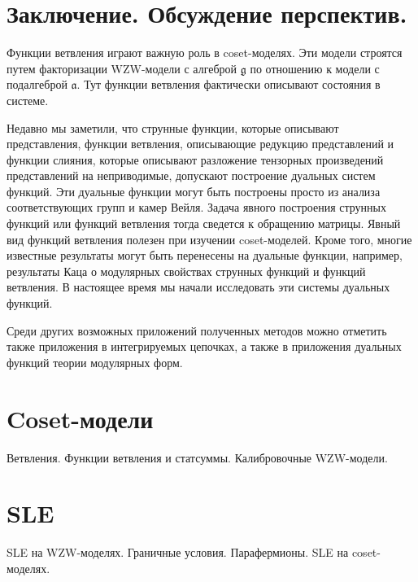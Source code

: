 \section{Заключение. Обсуждение перспектив.}
\label{sec:conlusion}

Функции ветвления играют важную роль в coset-моделях. Эти модели строятся путем факторизации
WZW-модели с алгеброй $\mathfrak{g}$ по отношению к модели с подалгеброй $\mathfrak{a}$. Тут функции
ветвления фактически описывают состояния в системе.

Недавно мы заметили, что струнные функции, которые описывают представления, функции ветвления,
описывающие редукцию представлений и функции слияния, которые описывают разложение тензорных
произведений представлений на неприводимые, допускают построение дуальных систем функций. Эти
дуальные функции могут быть построены просто из анализа соответствующих групп и камер Вейля. 
Задача явного построения струнных функций или функций ветвления тогда сведется к обращению матрицы.
Явный вид функций ветвления полезен при изучении coset-моделей. Кроме того, многие
известные результаты могут быть перенесены на дуальные функции, например, результаты Каца о модулярных свойствах
струнных функций и функций ветвления.
В настоящее время мы начали исследовать эти системы дуальных функций. 

Среди других возможных приложений полученных методов можно отметить также приложения в интегрируемых
цепочках, а также в приложения дуальных функций теории модулярных форм. 





\section{Coset-модели}
\label{sec:coset-models}
Ветвления. Функции ветвления и статсуммы. 
Калибровочные WZW-модели. 

\section{SLE}
\label{sec:sle}
SLE на WZW-моделях. Граничные условия. Парафермионы. SLE на coset-моделях.



